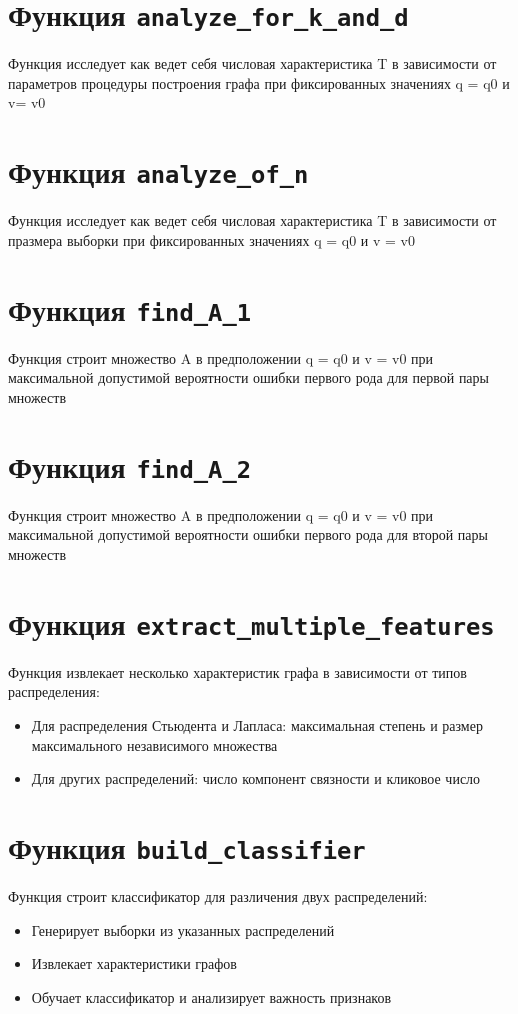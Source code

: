 \documentclass{article}
\begin{document}
\section{Функция \texttt{analyze\_for\_k\_and\_d}}

Функция исследует  как ведет себя числовая характеристика T в зависимости от параметров процедуры построения графа при фиксированных значениях q = q0 и v= v0

\section{Функция \texttt{analyze\_of\_n}}

Функция исследует  как ведет себя числовая характеристика T в зависимости от празмера выборки при фиксированных значениях q = q0 и v = v0

\section{Функция \texttt{find\_A\_1}}

Функция строит множество A в предположении q = q0 и v = v0 при максимальной допустимой вероятности ошибки первого рода для первой пары множеств

\section{Функция \texttt{find\_A\_2}}

Функция строит множество A в предположении q = q0 и v = v0 при максимальной допустимой вероятности ошибки первого рода для второй пары множеств

\section{Функция \texttt{extract\_multiple\_features}}
Функция извлекает несколько характеристик графа в зависимости от типов распределения:
\begin{itemize}
\item Для распределения Стьюдента и Лапласа: максимальная степень и размер максимального независимого множества
\item Для других распределений: число компонент связности и кликовое число
\end{itemize}

\section{Функция \texttt{build\_classifier}}
Функция строит классификатор для различения двух распределений:
\begin{itemize}
\item Генерирует выборки из указанных распределений
\item Извлекает характеристики графов
\item Обучает классификатор и анализирует важность признаков
\end{itemize}
\end{document}

